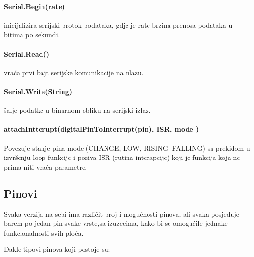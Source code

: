 \documentclass[../Document.tex]{subfiles}
\begin{document}
\paragraph{Serial.Begin(rate)} inicijalizira serijski protok podataka, gdje je rate brzina prenosa podataka u bitima po sekundi.

\paragraph{Serial.Read()} vraća prvi bajt serijske komunikacije na ulazu.

\paragraph{Serial.Write(String)} šalje podatke u binarnom obliku na serijski izlaz.

\paragraph{attachIntterupt(digitalPinToInterrupt(pin), ISR, mode )} Povezuje stanje pina mode (CHANGE, LOW, RISING, FALLING) sa prekidom u izvršenju loop funkcije i poziva ISR (rutina interapcije) koji je funkcija koja ne prima niti vraća parametre.


\subsection{Pinovi}\label{arduinopinovi}

Svaka verzija na sebi ima različit broj i mogućnosti pinova, ali svaka posjeduje barem po jedan pin svake vrste,sa izuzecima, kako bi se omogućile jednake funkcionalnosti svih ploča.

\noindent Dakle tipovi pinova koji postoje su:
\end{document}
